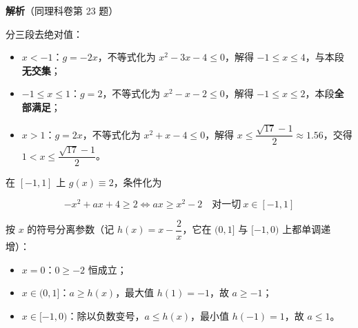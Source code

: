\textbf{解析}（同理科卷第 23 题）


分三段去绝对值：

\begin{itemize}
\item \textbf{$x<-1$}：$g=-2x$，不等式化为 $x^{2}-3x-4\le0$，解得 $-1\le x\le4$，与本段\textbf{无交集}；
\item \textbf{$-1\le x\le1$}：$g=2$，不等式化为 $x^{2}-x-2\le0$，解得 $-1\le x\le2$，本段\textbf{全部满足}；
\item \textbf{$x>1$}：$g=2x$，不等式化为 $x^{2}+x-4\le0$，解得 $x\le\dfrac{\sqrt{17}-1}2\approx1.56$，交得 $1<x\le\dfrac{\sqrt{17}-1}2$。
\end{itemize}



在 $[-1,1]$ 上 $g(x)\equiv2$，条件化为

\[-x^{2}+ax+4\ge2\iff ax\ge x^{2}-2\quad\text{对一切}\ x\in[-1,1]\]

按 $x$ 的符号分离参数（记 $h(x)=x-\dfrac2x$，它在 $(0,1]$ 与 $[-1,0)$ 上都单调递增）：

\begin{itemize}
\item $x=0$：$0\ge-2$ 恒成立；
\item $x\in(0,1]$：$a\ge h(x)$，最大值 $h(1)=-1$，故 $a\ge-1$；
\item $x\in[-1,0)$：除以负数变号，$a\le h(x)$，最小值 $h(-1)=1$，故 $a\le1$。
\end{itemize}


\par\medskip

